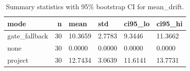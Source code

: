 \begin{table}
\caption{Summary statistics with 95\% bootstrap CI for mean_drift.}
\label{tab:mean_drift_summary}
\begin{tabular}{lrllll}
\toprule
mode & n & mean & std & ci95_lo & ci95_hi \\
\midrule
gate_fallback & 30 & 10.3659 & 2.7783 & 9.3446 & 11.3662 \\
none & 30 & 0.0000 & 0.0000 & 0.0000 & 0.0000 \\
project & 30 & 12.7434 & 3.0639 & 11.6141 & 13.7731 \\
\bottomrule
\end{tabular}
\end{table}
